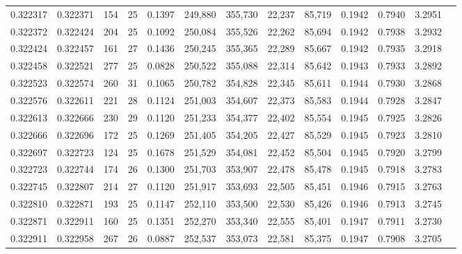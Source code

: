\begin{tabular}{rrrrrrrrrrrrr}
0.322317 & 0.322371 &   154 &  25 &                                     0.1397 & 249,880 & 355,730 &  22,237 &  85,719 & 0.1942 & 0.7940 & 3.2951 \\
0.322372 & 0.322424 &   204 &  25 &                                     0.1092 & 250,084 & 355,526 &  22,262 &  85,694 & 0.1942 & 0.7938 & 3.2932 \\
0.322424 & 0.322457 &   161 &  27 &                                     0.1436 & 250,245 & 355,365 &  22,289 &  85,667 & 0.1942 & 0.7935 & 3.2918 \\
0.322458 & 0.322521 &   277 &  25 &                                     0.0828 & 250,522 & 355,088 &  22,314 &  85,642 & 0.1943 & 0.7933 & 3.2892 \\
0.322523 & 0.322574 &   260 &  31 &                                     0.1065 & 250,782 & 354,828 &  22,345 &  85,611 & 0.1944 & 0.7930 & 3.2868 \\
0.322576 & 0.322611 &   221 &  28 &                                     0.1124 & 251,003 & 354,607 &  22,373 &  85,583 & 0.1944 & 0.7928 & 3.2847 \\
0.322613 & 0.322666 &   230 &  29 &                                     0.1120 & 251,233 & 354,377 &  22,402 &  85,554 & 0.1945 & 0.7925 & 3.2826 \\
0.322666 & 0.322696 &   172 &  25 &                                     0.1269 & 251,405 & 354,205 &  22,427 &  85,529 & 0.1945 & 0.7923 & 3.2810 \\
0.322697 & 0.322723 &   124 &  25 &                                     0.1678 & 251,529 & 354,081 &  22,452 &  85,504 & 0.1945 & 0.7920 & 3.2799 \\
0.322723 & 0.322744 &   174 &  26 &                                     0.1300 & 251,703 & 353,907 &  22,478 &  85,478 & 0.1945 & 0.7918 & 3.2783 \\
0.322745 & 0.322807 &   214 &  27 &                                     0.1120 & 251,917 & 353,693 &  22,505 &  85,451 & 0.1946 & 0.7915 & 3.2763 \\
0.322810 & 0.322871 &   193 &  25 &                                     0.1147 & 252,110 & 353,500 &  22,530 &  85,426 & 0.1946 & 0.7913 & 3.2745 \\
0.322871 & 0.322911 &   160 &  25 &                                     0.1351 & 252,270 & 353,340 &  22,555 &  85,401 & 0.1947 & 0.7911 & 3.2730 \\
0.322911 & 0.322958 &   267 &  26 &                                     0.0887 & 252,537 & 353,073 &  22,581 &  85,375 & 0.1947 & 0.7908 & 3.2705 \\

\end{tabular}
